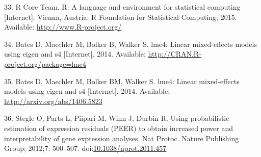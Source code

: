 \documentclass[]{article}
\begin{document}
33. R Core Team. R: A language and environment for statistical computing
{[}Internet{]}. Vienna, Austria: R Foundation for Statistical Computing;
2015. Available: \url{http://www.R-project.org/}

34. Bates D, Maechler M, Bolker B, Walker S. lme4: Linear mixed-effects
models using eigen and s4 {[}Internet{]}. 2014. Available:
\url{http://CRAN.R-project.org/package=lme4}

35. Bates D, Maechler M, Bolker BM, Walker S. lme4: Linear mixed-effects
models using eigen and s4 {[}Internet{]}. 2014. Available:
\url{http://arxiv.org/abs/1406.5823}

36. Stegle O, Parts L, Piipari M, Winn J, Durbin R. Using probabilistic
estimation of expression residuals (PEER) to obtain increased power and
interpretability of gene expression analyses. Nat Protoc. Nature
Publishing Group; 2012;7: 500--507.
doi:\href{http://dx.doi.org/10.1038/nprot.2011.457}{10.1038/nprot.2011.457}
\end{document}
